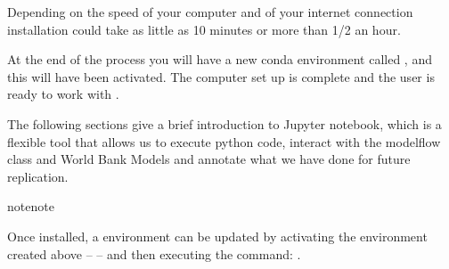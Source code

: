 \documentclass[letterpaper,10pt,english]{jupyterBook}
\begin{document}
\begin{sphinxVerbatim}[commandchars=\\\{\}]
          
  
  
     
    
   
   
   

\end{sphinxVerbatim}

\sphinxAtStartPar
Depending on the speed of your computer and of your internet connection installation could take as little as 10 minutes or more than 1/2 an hour.

\sphinxAtStartPar
At the end of the process you will have a new conda environment called , and this will have been activated. The computer set up is complete and the user is ready to work with .

\sphinxAtStartPar
The following sections give a brief introduction to Jupyter notebook, which is a flexible tool that allows us to execute python code, interact with the modelflow class and World Bank Models and annotate what we have done for future replication.

\begin{sphinxadmonition}{note}{note}

\sphinxAtStartPar
Once installed, a  environment can be updated by activating the  environment created above –  – and then executing the command: .
\end{sphinxadmonition}
\end{document}
